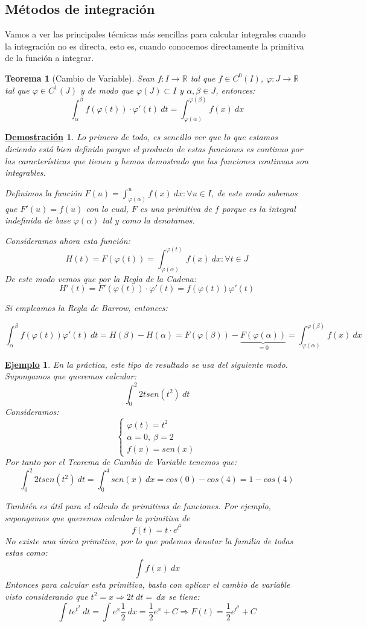\documentclass[10pt,a4paper,openright]{book}
\theoremstyle{break}
\newtheorem{theo}{Teorema}[chapter]
\newtheorem*{demo}{\underline{Demostración}}
\newtheorem{ej}{\underline{Ejemplo}}[chapter]
\newcommand{\dif}[1]{\ d#1}
\begin{document}
\subsection{Métodos de integración}
Vamos a ver las principales técnicas más sencillas para calcular integrales cuando la integración no es directa, esto es, cuando conocemos directamente la primitiva de la función a integrar.

\begin{theo}[Cambio de Variable]
Sean $f:I\rightarrow \mathbb R$ tal que $f\in C^0(I)$, $\varphi: J\rightarrow \mathbb R$ tal que $\varphi\in C^1(J)$ y de modo que $\varphi(J)\subset I$ y $\alpha,\beta\in J$, entonces:
$$\int_{\alpha}^{\beta} f(\varphi(t))\cdot \varphi'(t)\dif{t} = \int_{\varphi(\alpha)}^{\varphi(\beta)} f(x)\dif{x}$$
\end{theo}
\begin{demo}
Lo primero de todo, es sencillo ver que lo que estamos diciendo está bien definido porque el producto de estas funciones es continuo por las características que tienen y hemos demostrado que las funciones continuas son integrables.

Definimos la función $F(u)=\int_{\varphi(\alpha)}^{u} f(x)\dif{x}: \forall u \in I$, de este modo sabemos que $F'(u)=f(u)$ con lo cual, $F$ es una primitiva de $f$ porque es la integral indefinida de base $\varphi(\alpha)$ tal y como la denotamos.

Consideramos ahora esta función:
$$H(t)=F(\varphi(t))=\int_{\varphi(\alpha)}^{\varphi(t)} f(x)\dif{x}: \forall t\in J$$
De este modo vemos que por la Regla de la Cadena:
$$H'(t)=F'(\varphi(t))\cdot \varphi'(t)= f(\varphi(t))\varphi'(t)$$

Si empleamos la Regla de Barrow, entonces:

$$\int_{\alpha}^{\beta} f(\varphi(t)) \varphi ' (t) \dif{t} = H (\beta) - H(\alpha) = F(\varphi(\beta)) - \underbrace{F(\varphi(\alpha))}_{= 0} =  \int_{\varphi (\alpha)}^{\varphi (\beta)} f(x) \dif{x}$$
\end{demo}

\begin{ej}
En la práctica, este tipo de resultado se usa del siguiente modo. Supongamos que queremos calcular:
$$\int_{0}^{2} 2tsen(t^2)\dif{t}$$
Consideramos:
$$\begin{cases} \varphi(t)=t^2 \\ \alpha = 0, \ \beta = 2 \\
f(x)=sen(x)\end{cases}$$
Por tanto por el Teorema de Cambio de Variable tenemos que:
$$\int_{0}^{2} 2tsen(t^2)\dif{t} = \int_{0}^{4} sen(x)\dif{x} = cos(0)-cos(4)= 1-cos(4)$$

También es útil para el cálculo de primitivas de funciones. Por ejemplo, supongamos que queremos calcular la primitiva de
$$f(t)=t\cdot e^{t^2}$$
No existe una única primitiva, por lo que podemos denotar la familia de todas estas como:
$$\int f(x)\dif{x}$$
Entonces para calcular esta primitiva, basta con aplicar el cambio de variable visto considerando que $ t^2 = x \Rightarrow 2t\dif{t}=\dif{x}$ se tiene:
$$\int t e^{t^2} \dif{t}  = \int e^x \frac{1}{2} \dif{x} = \frac{1}{2} e^x + C \Rightarrow F(t)=\frac{1}{2}e^{t^2} + C$$
\end{ej}
\end{document}
